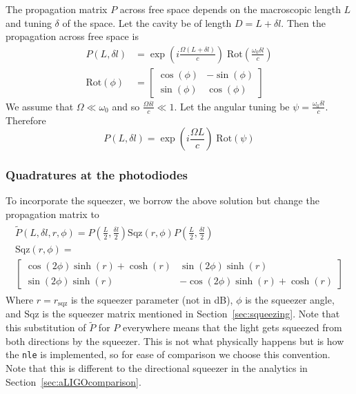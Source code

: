 \documentclass[aps,pra,superscriptaddress,reprint,nofootinbib]{revtex4-1}
\newcommand{\code}[1]{\texttt{#1}}
\begin{document}
The propagation matrix $P$ across free space depends on the macroscopic length $L$ and tuning $\delta$ of the space. Let the cavity be of length $D = L + \delta l$. Then the propagation across free space is
\begin{align}
P(L, \delta l) &= \exp\left(i\frac{\Omega (L + \delta l)}{c}\right) \;\mathrm{Rot}\left(\frac{\omega_0 \delta l}{c}\right) \\
\mathrm{Rot}(\phi) &= \begin{bmatrix}
\cos(\phi) & -\sin(\phi)\\ 
\sin(\phi) & \cos(\phi)\nonumber
\end{bmatrix}
\end{align}
We assume that $\Omega \ll \omega_0$ and so $\frac{\Omega \delta l}{c} \ll 1$. Let the angular tuning be $\psi = \frac{\omega_0 \delta l}{c}$. Therefore
\begin{equation}
P(L, \delta l) = \exp\left(i\frac{\Omega L}{c}\right) \;\mathrm{Rot}\left(\psi\right)
\end{equation}

\subsubsection{Quadratures at the photodiodes}

To incorporate the squeezer, we borrow the above solution but change the propagation matrix to
\begin{align}
	\begin{gathered}
	\tilde{P}(L, \delta l, r, \phi) = P\left(\frac{L}{2}, \frac{\delta l}{2}\right) \mathrm{Sqz}(r, \phi) P\left(\frac{L}{2}, \frac{\delta l}{2}\right) \\
	\mathrm{Sqz}(r, \phi) =\\
	\begin{bmatrix}
	\cos(2 \phi) \sinh(r) + \cosh(r) & \sin(2\phi) \sinh(r)\\ 
	\sin(2\phi) \sinh(r) & -\cos(2 \phi) \sinh(r) + \cosh(r)
	\end{bmatrix}
	\end{gathered}
\end{align}
Where $r = r_\mathrm{sqz}$ is the squeezer parameter (not in dB), $\phi$ is the squeezer angle, and $\mathrm{Sqz}$ is the squeezer matrix mentioned in Section~\ref{sec:squeezing}. Note that this substitution of $\tilde{P}$ for $P$ everywhere means that the light gets squeezed from both directions by the squeezer. This is not what physically happens but is how the \code{nle} is implemented, so for ease of comparison we choose this convention. Note that this is different to the directional squeezer in the analytics in Section~\ref{sec:aLIGOcomparison}.
\end{document}
